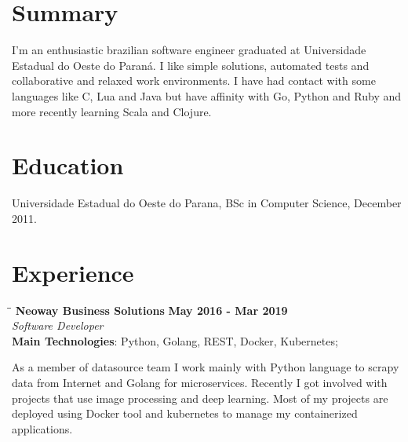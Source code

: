 \documentclass[margin]{res}
\begin{document}

\address{Brazil, BR \\ cadicallegari@gmail.com \\ Phone: +55 (48) 99826 4067}


\begin{resume}

\section{Summary}       I’m an enthusiastic brazilian software engineer graduated at Universidade Estadual do Oeste do Paraná. I like simple solutions, automated tests and collaborative and relaxed work environments.
I have had contact with some languages like C, Lua and Java but have affinity with Go, Python and Ruby and more recently learning Scala and Clojure.


\section{Education} Universidade Estadual do Oeste do Parana, BSc in Computer Science, December 2011.

\section{Experience}


\vspace{-0.1in}
   \begin{tabbing}
   \hspace{2.3in}\= \hspace{1.7in}\= \kill %
    \textbf{Neoway Business Solutions}    \>\>\textbf{May 2016 - Mar 2019}\\
    \textit{Software Developer}\\
    \textbf{Main Technologies}: Python, Golang, REST, Docker, Kubernetes;
   \end{tabbing}\vspace{-20pt}      %
    \vspace{2mm}
As a member of datasource team I work mainly with Python language to scrapy data from Internet and Golang for microservices. Recently I got involved with projects that use image processing and deep learning. Most of my projects are deployed using Docker tool and kubernetes to manage my containerized applications.



\end{resume}
\end{document}
